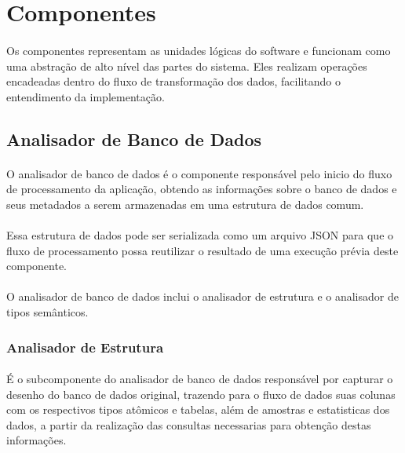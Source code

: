 \section{Componentes} 

\paragraph{} Os componentes representam as unidades lógicas do software e funcionam como uma abstração de alto nível das partes do sistema. Eles realizam operações encadeadas dentro do fluxo de transformação dos dados, facilitando o entendimento da implementação.

\subsection{Analisador de Banco de Dados}

\paragraph{} O analisador de banco de dados é o componente responsável pelo inicio do fluxo de processamento da aplicação, obtendo as informações sobre o banco de dados e seus metadados a serem armazenadas em uma estrutura de dados comum.

\paragraph{} Essa estrutura de dados pode ser serializada como um arquivo JSON para que o fluxo de processamento possa reutilizar o resultado de uma execução prévia deste componente.

\paragraph{} O analisador de banco de dados inclui o analisador de estrutura e o analisador de tipos semânticos.

\subsubsection{Analisador de Estrutura}

\paragraph{} É o subcomponente do analisador de banco de dados responsável por capturar o desenho do banco de dados original, trazendo para o fluxo de dados suas colunas com os respectivos tipos atômicos e tabelas, além de amostras e estatisticas dos dados, a partir da realização das consultas necessarias para obtenção destas informações.

